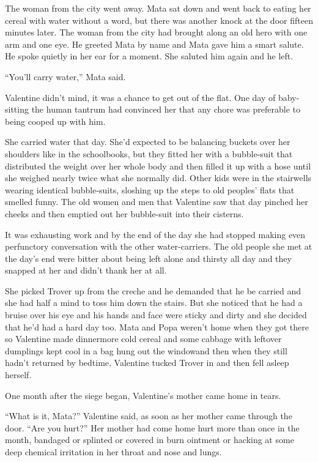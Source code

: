 The woman from the city went away. Mata sat down and went back to
eating her cereal with water without a word, but there was another
knock at the door fifteen minutes later. The woman from the city
had brought along an old hero with one arm and one eye. He greeted
Mata by name and Mata gave him a smart salute. He spoke quietly in
her ear for a moment. She saluted him again and he left.

“You’ll carry water,” Mata said.

Valentine didn’t mind, it was a chance to get out of the flat. One
day of baby-sitting the human tantrum had convinced her that any
chore was preferable to being cooped up with him.

She carried water that day. She’d expected to be balancing buckets
over her shoulders like in the schoolbooks, but they fitted her
with a bubble-suit that distributed the weight over her whole body
and then filled it up with a hose until she weighed nearly twice
what she normally did. Other kids were in the stairwells wearing
identical bubble-suits, sloshing up the steps to old peoples’ flats
that smelled funny. The old women and men that Valentine saw that
day pinched her cheeks and then emptied out her bubble-suit into
their cisterns.

It was exhausting work and by the end of the day she had stopped
making even perfunctory conversation with the other water-carriers.
The old people she met at the day’s end were bitter about being
left alone and thirsty all day and they snapped at her and didn’t
thank her at all.

She picked Trover up from the creche and he demanded that he be
carried and she had half a mind to toss him down the stairs. But
she noticed that he had a bruise over his eye and his hands and
face were sticky and dirty and she decided that he’d had a hard day
too. Mata and Popa weren’t home when they got there so Valentine
made dinner\dash{}more cold cereal and some cabbage with leftover
dumplings kept cool in a bag hung out the window\dash{}and then when they
still hadn’t returned by bedtime, Valentine tucked Trover in and
then fell asleep herself.

\tb

One month after the siege began, Va\-len\-tine’s mother came home in
tears.

“What is it, Mata?” Valentine said, as soon as her mother came
through the door. “Are you hurt?” Her mother had come home hurt
more than once in the month, bandaged or splinted or covered in
burn ointment or hacking at some deep chemical irritation in her
throat and nose and lungs.

